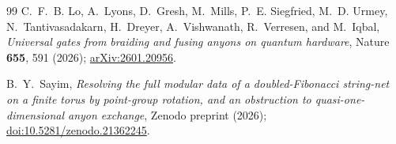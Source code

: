 \documentclass[aps,pra,twocolumn,superscriptaddress,longbibliography,floatfix,nofootinbib]{revtex4-2}
\begin{document}
\begin{thebibliography}{99}
C.~F.~B. Lo, A.~Lyons, D.~Gresh, M.~Mills, P.~E. Siegfried, M.~D. Urmey,
N.~Tantivasadakarn, H.~Dreyer, A.~Vishwanath, R.~Verresen, and M.~Iqbal,
\emph{Universal gates from braiding and fusing anyons on quantum
hardware},
Nature \textbf{655}, 591 (2026);
\href{https://arxiv.org/abs/2601.20956}{arXiv:2601.20956}.

B.~Y.~Sayim,
\emph{Resolving the full modular data of a doubled-Fibonacci string-net on a finite torus by
point-group rotation, and an obstruction to quasi-one-dimensional anyon exchange},
Zenodo preprint (2026);
\href{https://doi.org/10.5281/zenodo.21362245}{doi:10.5281/zenodo.21362245}.

\end{thebibliography}
\end{document}
